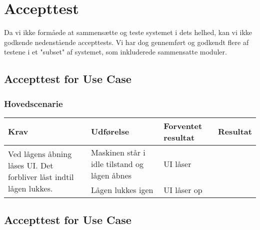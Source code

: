 \chapter{Accepttest}
Da vi ikke formåede at sammensætte og teste systemet i dets helhed, kan vi ikke godkende nedenstående accepttests. Vi har dog gennemført og godkendt flere af testene i et "subset" af systemet, som inkluderede sammensatte moduler.

\section{Accepttest for Use Case } 

 
 \subsection{Hovedscenarie}
\begin{center}

	\begin{tabular}{| p{3cm} | p{3cm} | p{3cm} | p{3cm} |}
		\hline
		Krav & Udførelse & Forventet resultat & Resultat \\ \hline
		
		\multirow{2}{3cm}{Ved lågens åbning låses UI. Det forbliver låst indtil lågen lukkes.} 
		& Maskinen står i idle tilstand og lågen åbnes
		& UI låser
		& \\ \cline{2-4}
		
		&Lågen lukkes igen
		
		&UI låser op
		& \\ \hline 
		

	\end{tabular}
\end{center}


\section{Accepttest for Use Case } 

